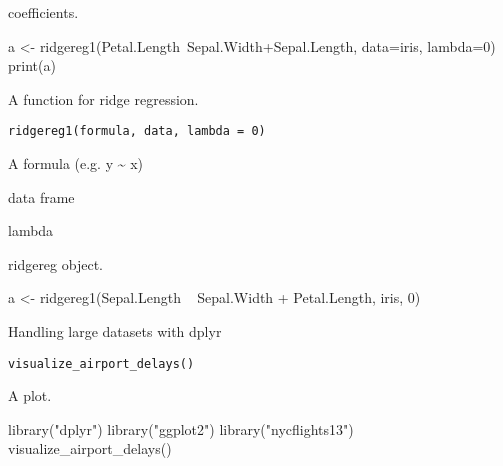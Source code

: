 \documentclass[a4paper]{book}
\begin{document}
%
\begin{Value}
coefficients.
\end{Value}
%
\begin{Examples}
\begin{ExampleCode}
a <- ridgereg1(Petal.Length~Sepal.Width+Sepal.Length, data=iris, lambda=0)
print(a)
\end{ExampleCode}
\end{Examples}
%
\begin{Description}\relax
A function for ridge regression.
\end{Description}
%
\begin{Usage}
\begin{verbatim}
ridgereg1(formula, data, lambda = 0)
\end{verbatim}
\end{Usage}
%
\begin{Arguments}
\begin{ldescription}
\item[\code{formula}] A formula (e.g. y \textasciitilde{} x)

\item[\code{data}] data frame

\item[\code{lambda}] lambda
\end{ldescription}
\end{Arguments}
%
\begin{Value}
ridgereg object.
\end{Value}
%
\begin{Examples}
\begin{ExampleCode}
a <- ridgereg1(Sepal.Length ~ Sepal.Width + Petal.Length, iris, 0)
\end{ExampleCode}
\end{Examples}
%
\begin{Description}\relax
Handling large datasets with dplyr
\end{Description}
%
\begin{Usage}
\begin{verbatim}
visualize_airport_delays()
\end{verbatim}
\end{Usage}
%
\begin{Value}
A plot.
\end{Value}
%
\begin{Examples}
\begin{ExampleCode}
library("dplyr")
library("ggplot2")
library("nycflights13")
visualize_airport_delays()
\end{ExampleCode}
\end{Examples}
\printindex{}
\end{document}
